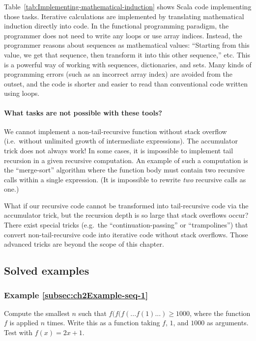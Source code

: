 \noindent Table~\ref{tab:Implementing-mathematical-induction} shows
Scala code implementing those tasks. Iterative calculations are implemented
by translating mathematical induction directly into code. In the functional
programming paradigm, the programmer does not need to write any loops
or use array indices. Instead, the programmer reasons about sequences
as mathematical values: ``Starting from this value, we get that sequence,
then transform it into this other sequence,'' etc. This is a powerful
way of working with sequences, dictionaries, and sets. Many kinds
of programming errors (such as an incorrect array index) are avoided
from the outset, and the code is shorter and easier to read than conventional
code written using loops.

\paragraph*{What tasks are not possible with these tools?}

We cannot implement a non-tail-recursive function without stack overflow
(i.e.~without unlimited growth of intermediate expressions). The
accumulator trick does not always work! In some cases, it is impossible
to implement tail recursion in a given recursive computation. An example
of such a computation is the ``merge-sort'' algorithm where the
function body must contain two recursive calls within a single expression.
(It is impossible to rewrite \emph{two} recursive calls as one.) 

What if our recursive code cannot be transformed into tail-recursive
code via the accumulator trick, but the recursion depth is so large
that stack overflows occur? There exist special tricks (e.g.~the
``continuation-passing'' or ``trampolines'')
that convert non-tail-recursive code into iterative code without stack
overflows. Those advanced tricks are beyond the scope of this chapter.

\subsection{Solved examples}

\subsubsection{Example \label{subsec:ch2Example-seq-1}\ref{subsec:ch2Example-seq-1}}

Compute the smallest $n$ such that $f(f(f(...f(1)...)\geq1000$,
where the function $f$ is applied $n$ times. Write this as a function
taking $f$, $1$, and $1000$ as arguments. Test with $f(x)=2x+1$.


